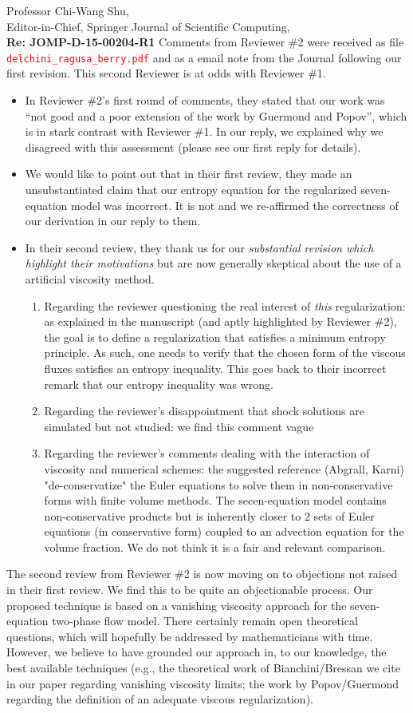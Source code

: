 \documentclass[11pt]{letter}
\newcommand{\tcr}[1]{\textcolor{red}{#1}}
\begin{document}
\begin{letter}{Professor Chi-Wang Shu, \\  Editor-in-Chief, Springer Journal of Scientific Computing,\\
\textbf{Re: JOMP-D-15-00204-R1}}
Comments from Reviewer \#2 were received as file \tcr{{\tt delchini\_ragusa\_berry.pdf}}
and as a email note from the Journal following our first revision. This second Reviewer is at odds with Reviewer \#1.
\begin{itemize}
\item 
In Reviewer \#2's first round of comments, 
they stated that our work was ``not good and a poor extension of the work by Guermond and Popov'', which is in stark
contrast with Reviewer \#1. In our reply, we explained why we disagreed with this assessment (please see our first reply for details). 
\item We would like to point out that in their first review, they made an unsubstantiated  claim that our entropy equation for the 
regularized seven-equation model was incorrect. It is not and we re-affirmed the correctness of our derivation in our reply to them. 
\item In their second review, they thank us for our {\it substantial revision which highlight their motivations} but are now generally skeptical about the use of a artificial viscosity method. 
\begin{enumerate}
\item Regarding the reviewer questioning the real interest of {\it this} regularization: as explained 
in the manuscript (and aptly highlighted by Reviewer \#2),  the goal is to define a regularization 
that satisfies a minimum entropy principle. As such, one needs to verify that the chosen form of the viscous fluxes satisfies an entropy inequality. This goes back to their incorrect remark that our entropy inequality was wrong. 
\item Regarding the reviewer's disappointment that shock solutions are simulated but not studied: we find this comment vague
\item Regarding the reviewer's comments dealing with the interaction of viscosity and numerical schemes: the suggested reference (Abgrall, Karni) "de-conservatize" the Euler equations to solve them in non-conservative forms with finite volume methods. The secen-equation model contains non-conservative products but is inherently closer to 2 sets of Euler equations (in conservative form) coupled to an advection equation for the volume fraction. We do not think it is a fair and relevant comparison. 
\end{enumerate} 
\end{itemize}
%
The second review from Reviewer \#2 is now moving on to objections not raised in their first review. 
We find this to be quite an objectionable process. Our proposed technique 
is based on a vanishing viscosity approach for the seven-equation two-phase flow model. 
There certainly remain open theoretical questions, which will hopefully be addressed by mathematicians with time. However, we believe to have grounded our approach in, to our knowledge, the best available techniques (e.g., the theoretical 
work of Bianchini/Bressan we cite in our paper regarding vanishing viscosity limits; the work by Popov/Guermond
regarding the definition of an adequate viscous regularization). 


\end{letter}
\end{document}

